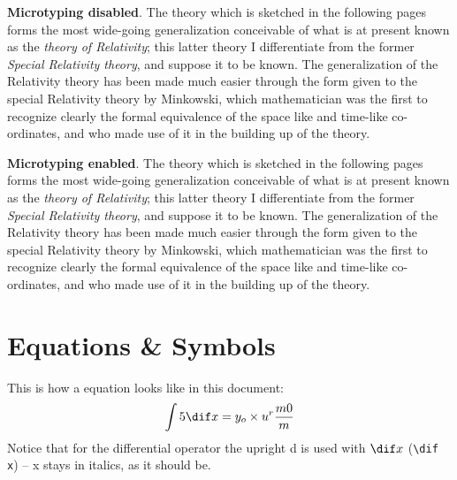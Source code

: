 \textbf{Microtyping disabled}. The theory which is sketched in the following pages forms the most wide-going generalization conceivable of what is at present known as the \emph{theory of Relativity}; this latter theory I differentiate from the former \emph{Special Relativity theory}, and suppose it to be known. The generalization of the Relativity theory has been made much easier through the form given to the special Relativity theory by Minkowski, which mathematician was the first to recognize clearly the formal equivalence of the space like and time-like co-ordinates, and who made use of it in the building up of the theory.

\textbf{Microtyping enabled}. The theory which is sketched in the following pages forms the most wide-going generalization conceivable of what is at present known as the \emph{theory of Relativity}; this latter theory I differentiate from the former \emph{Special Relativity theory}, and suppose it to be known. The generalization of the Relativity theory has been made much easier through the form given to the special Relativity theory by Minkowski, which mathematician was the first to recognize clearly the formal equivalence of the space like and time-like co-ordinates, and who made use of it in the building up of the theory.

\section{Equations \& Symbols} %
\label{sec:equations}
This is how a equation looks like in this document:
\begin{align}
	\int 5 \dif x = y_o \times u^r \frac{m 0}{m}
\end{align}
Notice that for the differential operator the upright d is used with $\dif x$ (\verb|\dif x|) -- x stays in italics, as it should be.

